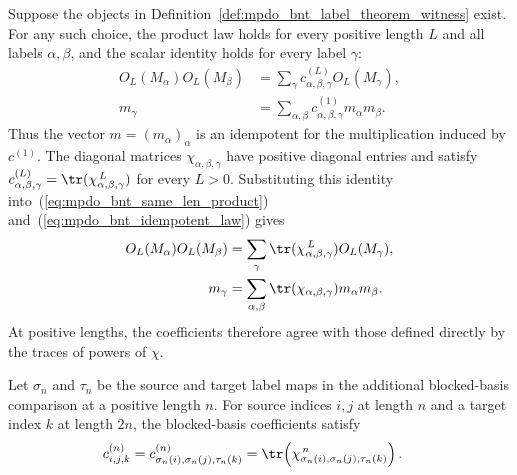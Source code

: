 \begin{lemma}%
    \label{thm:mpdo_has_bnt_label_theorem_witness_source_equations}
    \leanok
    Suppose the objects in
    Definition~\ref{def:mpdo_bnt_label_theorem_witness} exist.
    For any such choice, the product law holds for every positive length
    $L$ and all labels $\alpha,\beta$, and the scalar identity holds for
    every label $\gamma$:
    \begin{align}
        O_L(M_\alpha)O_L(M_\beta)
         & = \sum_\gamma c^{(L)}_{\alpha,\beta,\gamma} O_L(M_\gamma),
        \label{eq:mpdo_bnt_same_len_product}                                    \\
        m_\gamma
         & = \sum_{\alpha,\beta} c^{(1)}_{\alpha,\beta,\gamma}m_\alpha m_\beta.
        \label{eq:mpdo_bnt_idempotent_law}
    \end{align}
    Thus the vector $m=(m_\alpha)_\alpha$ is an idempotent for the
    multiplication induced by $c^{(1)}$.
    The diagonal matrices $\chi_{\alpha,\beta,\gamma}$ have positive
    diagonal entries and satisfy
    $c^{(L)}_{\alpha,\beta,\gamma}
        = \tr(\chi_{\alpha,\beta,\gamma}^{\,L})$
    for every $L>0$.
    Substituting this identity into~(\ref{eq:mpdo_bnt_same_len_product})
    and~(\ref{eq:mpdo_bnt_idempotent_law}) gives
    \begin{align}
        O_L(M_\alpha)O_L(M_\beta)
         & = \sum_\gamma \tr(\chi_{\alpha,\beta,\gamma}^{\,L}) O_L(M_\gamma),
        \label{eq:mpdo_bnt_same_len_product_chi}                                   \\
        m_\gamma
         & = \sum_{\alpha,\beta} \tr(\chi_{\alpha,\beta,\gamma}) m_\alpha m_\beta.
        \label{eq:mpdo_bnt_idempotent_law_chi}
    \end{align}
    At positive lengths, the coefficients therefore agree with those
    defined directly by the traces of powers of $\chi$.

    Let $\sigma_n$ and $\tau_n$ be the source and target label maps in
    the additional blocked-basis comparison at a positive length $n$.
    For source indices $i,j$ at length $n$ and a target index $k$ at
    length $2n$, the blocked-basis coefficients satisfy
    \begin{align}
        c^{(n)}_{i,j,k}
         & = c^{(n)}_{\sigma_n(i),\sigma_n(j),\tau_n(k)}
        = \tr\!\left(\chi_{\sigma_n(i),\sigma_n(j),\tau_n(k)}^{\,n}\right).
        \notag
    \end{align}
\end{lemma}
